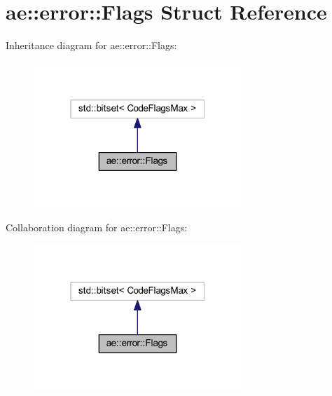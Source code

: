 \hypertarget{structae_1_1error_1_1_flags}{}\section{ae\+:\+:error\+:\+:Flags Struct Reference}
\label{structae_1_1error_1_1_flags}


Inheritance diagram for ae\+:\+:error\+:\+:Flags\+:
\nopagebreak
\begin{figure}[H]
\begin{center}
\leavevmode
\includegraphics[width=223pt]{structae_1_1error_1_1_flags__inherit__graph}
\end{center}
\end{figure}


Collaboration diagram for ae\+:\+:error\+:\+:Flags\+:
\nopagebreak
\begin{figure}[H]
\begin{center}
\leavevmode
\includegraphics[width=223pt]{structae_1_1error_1_1_flags__coll__graph}
\end{center}
\end{figure}
